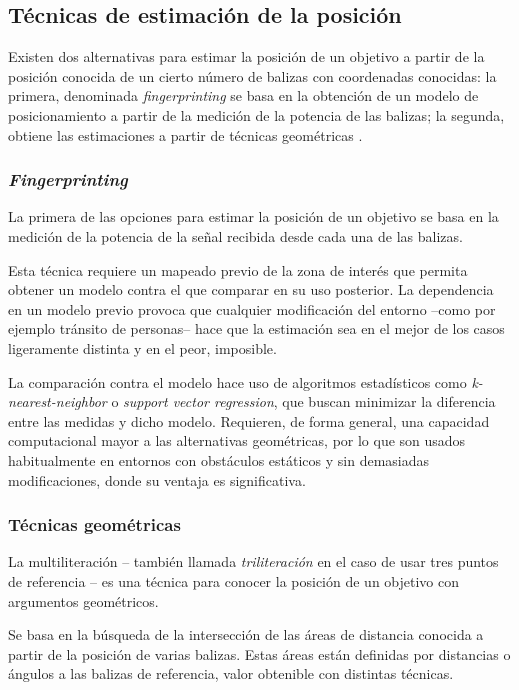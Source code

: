 \subsection{Técnicas de estimación de la posición}

Existen dos alternativas para estimar la posición de un objetivo a partir de la posición conocida de un cierto número de balizas con coordenadas conocidas: la primera, denominada \textit{fingerprinting} se basa en la obtención de un modelo de posicionamiento a partir de la medición de la potencia de las balizas; la segunda, obtiene las estimaciones a partir de técnicas geométricas \cite{MAIN}.

\subsubsection{\textit{Fingerprinting}}

La primera de las opciones para estimar la posición de un objetivo se basa en la medición de la potencia de la señal recibida desde cada una de las balizas.

Esta técnica requiere un mapeado previo de la zona de interés que permita obtener un modelo contra el que comparar en su uso posterior.
La dependencia en un modelo previo provoca que cualquier modificación del entorno --como por ejemplo tránsito de personas-- hace que la estimación sea en el mejor de los casos ligeramente distinta y en el peor, imposible.

La comparación contra el modelo hace uso de algoritmos estadísticos como \textit{k-nearest-neighbor} o \textit{support vector regression}, que buscan minimizar la diferencia entre las medidas y dicho modelo. 
Requieren, de forma general, una capacidad computacional mayor a las alternativas geométricas, por lo que son usados habitualmente en entornos con obstáculos estáticos y sin demasiadas modificaciones, donde su ventaja es significativa.

\subsubsection{Técnicas geométricas}

La multiliteración -- también llamada \textit{triliteración} en el caso de usar tres puntos de referencia -- es una técnica para conocer la posición de un objetivo con argumentos geométricos.

Se basa en la búsqueda de la intersección de las áreas de distancia conocida a partir de la posición de varias balizas.
Estas áreas están definidas por distancias o ángulos a las balizas de referencia, valor obtenible con distintas técnicas.

